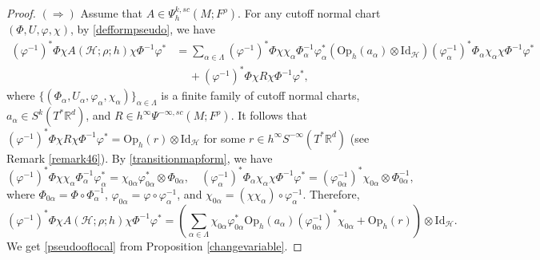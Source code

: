 \documentclass[11pt,oneside,reqno]{amsart}
\newcommand\R{\ensuremath{\mathbb{R}}}
\newcommand\Oph{\ensuremath{\mathrm{Op}_h}}
\theoremstyle{definition}
\numberwithin{equation}{section}
\theoremstyle{plain}
\begin{document}
\begin{proof}
    $(\Rightarrow)$ Assume that $A\in \Psi_h^{k,sc}(M;F^\rho)$. For any cutoff normal chart $(\Phi, U,\varphi,\chi)$, by \eqref{defformpseudo}, we have
    \begin{equation*}
    \begin{aligned}
        (\varphi^{-1})^*\Phi \chi A (\mathcal{H};\rho;h) \chi \Phi^{-1} \varphi^* &= \sum_{\alpha\in \Lambda} (\varphi^{-1})^*\Phi \chi \chi_{\alpha}\Phi_{\alpha}^{-1} \varphi_{\alpha}^*
        ( \Oph(a_{\alpha})\otimes \mathrm{Id}_{\mathcal{H}})
        (\varphi_{\alpha}^{-1})^* \Phi_{\alpha}\chi_{\alpha} \chi \Phi^{-1} \varphi^* \\
        & \quad \, + (\varphi^{-1})^*\Phi \chi R\chi \Phi^{-1} \varphi^* ,
    \end{aligned}
    \end{equation*}
where $ \{ (\Phi_{\alpha}, U_{\alpha}, \varphi_{\alpha},\chi_{\alpha} ) \}_{\alpha\in \Lambda}$ is a finite family of cutoff normal charts, $a_{\alpha}\in S^{k}(T^*\mathbb{R}^d)$, and $R \in h^{\infty}\Psi^{-\infty,sc}(M;F^\rho)$. It follows that $(\varphi^{-1})^*\Phi \chi R\chi \Phi^{-1} \varphi^* = \Oph(r) \otimes \mathrm{Id}_{\mathcal{H}}$ for some $r \in h^\infty S^{-\infty}(T^*\R^d)$ (see Remark \ref{remark46}). By \eqref{transitionmapform}, we have
\begin{equation*}
    (\varphi^{-1})^*\Phi \chi \chi_{\alpha}\Phi_{\alpha}^{-1} \varphi_{\alpha}^* = \chi_{0\alpha } \varphi^*_{0\alpha} \otimes \Phi_{0\alpha}, \quad
    (\varphi_{\alpha}^{-1})^* \Phi_{\alpha}\chi_{\alpha} \chi \Phi^{-1} \varphi^* = (\varphi_{0\alpha }^{-1})^* \chi_{0\alpha}  \otimes \Phi_{0\alpha}^{-1},
\end{equation*}
where $\Phi_{0\alpha} =\Phi \circ \Phi_\alpha^{-1}$, $\varphi_{0\alpha} = \varphi  \circ \varphi_\alpha^{-1}$, and $\chi_{0 \alpha } = (\chi \chi_\alpha  ) \circ \varphi_\alpha^{-1}$. Therefore,
\begin{equation*}
    (\varphi^{-1})^*\Phi \chi A (\mathcal{H};\rho;h) \chi \Phi^{-1} \varphi^*  = \left(\sum_{\alpha\in \Lambda} \chi_{0\alpha } \varphi^*_{0\alpha } \Oph(a_{\alpha})
       (\varphi_{0\alpha }^{-1})^* \chi_{0\alpha}  + \Oph(r)\right)\otimes \mathrm{Id}_{\mathcal{H}}.
\end{equation*}
We get \eqref{pseudooflocal} from Proposition \ref{changevariable}. 


\end{proof}
\end{document}
